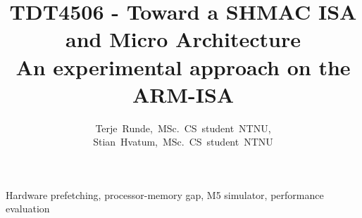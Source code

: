 \documentclass[journal]{IEEEtran}
\begin{document}
\title{\small{TDT4506 - Toward a SHMAC ISA and Micro Architecture}\\\Huge{An experimental approach on the ARM-ISA}}

\author{Terje~Runde,~MSc.~CS~student~NTNU,
        Stian~Hvatum,~MSc.~CS~student~NTNU}

\maketitle



\begin{IEEEkeywords}
Hardware prefetching, processor-memory gap, M5 simulator, performance evaluation
\end{IEEEkeywords}










\end{document}
